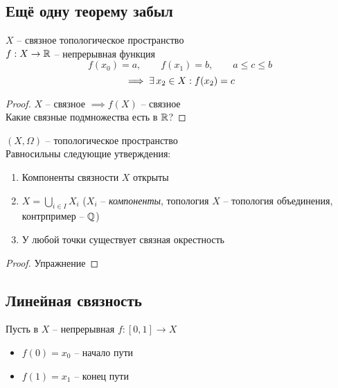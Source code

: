 \chapter{}

\section{Ещё одну теорему забыл}

\begin{theorem}
	$ X $ -- связное топологическое пространство \\
    $ f : X \to \mathbb{R} $ -- непрерывная функция
    $$ f(x_0) = a, \qquad f(x_1) = b, \qquad a \le c \le b $$
    $$ \implies \exists\, x_2 \in X : f(x_2) = c $$
\end{theorem}

\begin{proof}
	$ X $ -- связное $ \implies f(X) $ -- связное \\
    Какие связные подмножества есть в $ \mathbb{R} $?
\end{proof}

\begin{theorem}
	$ (X, \Omega) $ -- топологическое пространство \\
    Равносильны следующие утверждения:
    \begin{enumerate}
        \item \label{en:1} Компоненты связности $ X $ открыты
        \item \label{en:2} $ X = \bigcup_{i \in I} X_i $ ($ X_i $ -- \textit{компоненты}, топология $ X $ -- топология объединения, контрпример -- $ \mathbb{Q} $)
        \item \label{en:3} У любой точки существует связная окрестность
    \end{enumerate}
\end{theorem}

\begin{proof}
	Упражнение
\end{proof}

\section{Линейная связность}

\begin{definition}
	Пусть в $ X $ -- непрерывная $ f : [0, 1] \to X $
    \begin{itemize}
    	\item $ f(0) = x_0 $ -- начало пути
        \item $ f(1) = x_1 $ -- конец пути
    \end{itemize}
\end{definition}

